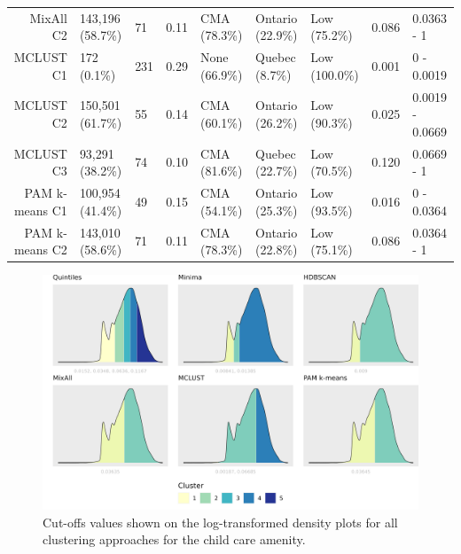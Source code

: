 \documentclass[11pt, a4paper]{article}
\begin{document}
\begin{table}[H]
{\begin{tabular}{|r|llllllll|}
  MixAll C2 & 143,196 (58.7\%) & 71 & 0.11 & CMA (78.3\%) & Ontario (22.9\%) & Low (75.2\%) & 0.086 & 0.0363 - 1 \\
\rowcolor{gray!25}  MCLUST C1 & 172 (0.1\%) & 231 & 0.29 & None (66.9\%) & Quebec (8.7\%) & Low (100.0\%) & 0.001 & 0 - 0.0019 \\
\rowcolor{gray!25}  MCLUST C2 & 150,501 (61.7\%) & 55 & 0.14 & CMA (60.1\%) & Ontario (26.2\%) & Low (90.3\%) & 0.025 & 0.0019 - 0.0669 \\
 \rowcolor{gray!25} MCLUST C3 & 93,291 (38.2\%) & 74 & 0.10 & CMA (81.6\%) & Quebec (22.7\%) & Low (70.5\%) & 0.120 & 0.0669 - 1 \\
  PAM k-means C1 & 100,954 (41.4\%) & 49 & 0.15 & CMA (54.1\%) & Ontario (25.3\%) & Low (93.5\%) & 0.016 & 0 - 0.0364 \\
  PAM k-means C2 & 143,010 (58.6\%) & 71 & 0.11 & CMA (78.3\%) & Ontario (22.8\%) & Low (75.1\%) & 0.086 & 0.0364 - 1 \\
   \hline
\end{tabular}
}
\end{table}





\begin{figure}[H]
\centering
\includegraphics[width=\textwidth]{./cutoffs/by_amenity/Child care_cutoffs.png}
\caption[Child care cutoffs]{Cut-offs values shown on the log-transformed density plots for all clustering approaches for the child care amenity.}\label{childcarecutoffs}
\end{figure}
\end{document}
